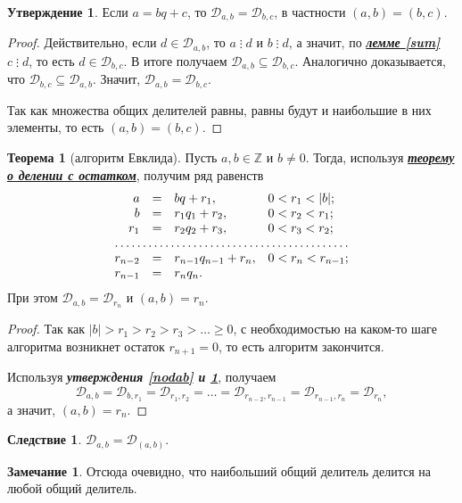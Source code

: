 \documentclass[14pt, a4paper]{extarticle}
\theoremstyle{definition}
\newtheorem{theorem}{Теорема}
\newtheorem*{remark}{Замечание}
\newtheorem{corollary}{Следствие}[theorem]
\newtheorem{statement}{Утверждение}
\newcommand{\divisible}{\mathop{\vdots}}
\begin{document}
	\begin{statement}
	\label{nodabc}
		Если $a=bq+c$, то $\mathcal{D}_{a,b}=\mathcal{D}_{b,c}$, в частности \mbox{$(a,b)=(b,c)$}.
	\end{statement}
	\begin{proof}
		Действительно, если $d\in\mathcal{D}_{a,b}$, то $a\divisible d$ и $b\divisible d$, а значит, по \hyperref[sum]{\textbf{\textit{лемме \ref*{sum}}}} $c\divisible d$, то есть $d\in\mathcal{D}_{b,c}$. В итоге получаем \mbox{$\mathcal{D}_{a,b}\subseteq\mathcal{D}_{b,c}$}. Аналогично доказывается, что $\mathcal{D}_{b,c}\subseteq\mathcal{D}_{a,b}$. Значит, $\mathcal{D}_{a,b}=\mathcal{D}_{b,c}$.
		
		Так как множества общих делителей равны, равны будут и наибольшие в них элементы, то есть $(a,b)=(b,c)$.
	\end{proof}

	\begin{theorem}[алгоритм Евклида]
		Пусть $a,b\in\mathbb{Z}$ и $b\neq0$. Тогда, используя \hyperref[ost]{\textbf{\textit{теорему о делении с остатком}}}, получим ряд равенств
		\begin{equation}
		\label{eq5}
		\begin{array}{rcll}
			a&=&bq+r_1,&0<r_1<|b|;\\
			b&=&r_1q_1+r_2,&0<r_2<r_1;\\
			r_1&=&r_2q_2+r_3,&0<r_3<r_2;\\
			\hdotsfor{4}\\
			r_{n-2}&=&r_{n-1}q_{n-1}+r_n,&0<r_n<r_{n-1};\\
			r_{n-1}&=&r_nq_n.
		\end{array}
		\end{equation}
		При этом $\mathcal{D}_{a,b}=\mathcal{D}_{r_n}$ и $(a,b)=r_n$.
	\end{theorem}
	\begin{proof}
		Так как $|b|>r_1>r_2>r_3>\dots\geqslant0$, с необходимостью на каком-то шаге алгоритма возникнет остаток $r_{n+1}=0$, то есть алгоритм закончится.
		
		Используя \textbf{\textit{утверждения \ref{nodab} и \ref{nodabc}}}, получаем
		$$\mathcal{D}_{a,b}=\mathcal{D}_{b,r_1}=\mathcal{D}_{r_1,r_2}=\dots=\mathcal{D}_{r_{n-2},r_{n-1}}=\mathcal{D}_{r_{n-1},r_n}=\mathcal{D}_{r_n},$$
		а значит, $(a,b)=r_n$.
	\end{proof}

	\begin{corollary}
	\label{mndel}
		$\mathcal{D}_{a,b}=\mathcal{D}_{(a,b)}$.
	\end{corollary}
	\begin{remark}
		Отсюда очевидно, что наибольший общий делитель делится на любой общий делитель.
	\end{remark}
\end{document}
